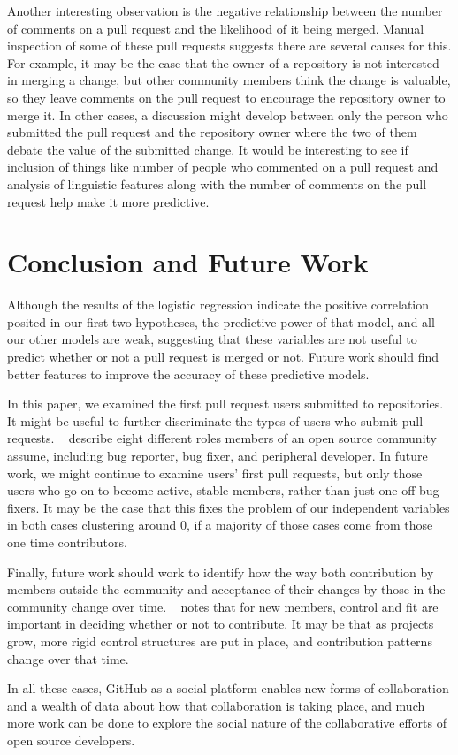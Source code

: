 \documentclass[12pt]{article}
\begin{document}
Another interesting observation is the negative relationship between the number
of comments on a pull request and the likelihood of it being merged. Manual
inspection of some of these pull requests suggests there are several causes for
this. For example, it may be the case that the owner of a repository is not
interested in merging a change, but other community members think the change is
valuable, so they leave comments on the pull request to encourage the repository
owner to merge it. In other cases, a discussion might develop between only the
person who submitted the pull request and the repository owner where the two of
them debate the value of the submitted change. It would be interesting to see if
inclusion of things like number of people who commented on a pull request and
analysis of linguistic features along with the number of comments on the pull
request help make it more predictive.

\section{Conclusion and Future Work}\label{conclusion}
Although the results of the logistic regression indicate the positive
correlation posited in our first two hypotheses, the predictive power of that
model, and all our other models are weak, suggesting that these variables are
not useful to predict whether or not a pull request is merged or not. Future
work should find better features to improve the accuracy of these predictive
models.

In this paper, we examined the first pull request users submitted to
repositories. It might be useful to further discriminate the types of users who
submit pull requests. ~\cite{nakakoji_evolution_2002} describe eight different
roles members of an open source community assume, including bug reporter, bug
fixer, and peripheral developer. In future work, we might continue to examine
users' first pull requests, but only those users who go on to become active,
stable members, rather than just one off bug fixers. It may be the case that
this fixes the problem of our independent variables in both cases clustering
around 0, if a majority of those cases come from those one time contributors.

Finally, future work should work to identify how the way both contribution by
members outside the community and acceptance of their changes by those in the
community change over time. ~\cite{shah_motivation_2006} notes that for new
members, control and fit are important in deciding whether or not to contribute.
It may be that as projects grow, more rigid control structures are put in place,
and contribution patterns change over that time.

In all these cases, GitHub as a social platform enables new forms of
collaboration and a wealth of data about how that collaboration is taking
place, and much more work can be done to explore the social nature of the
collaborative efforts of open source developers.



\end{document}
